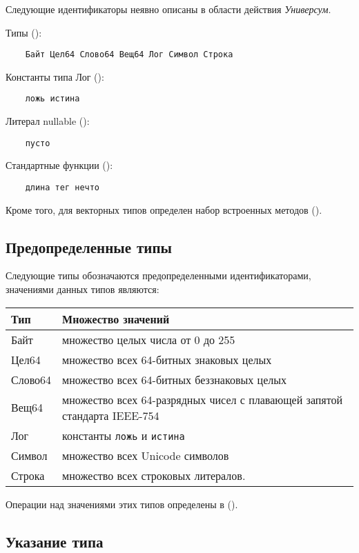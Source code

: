 Следующие идентификаторы неявно описаны в области действия \emph{Универсум}.
\bigskip

Типы ():
\begin{Verbatim}
    Байт Цел64 Слово64 Вещ64 Лог Символ Строка
\end{Verbatim}

Константы типа Лог ():
\begin{Verbatim}
    ложь истина
\end{Verbatim}

Литерал nullable (\See{}):
\begin{Verbatim}
    пусто
\end{Verbatim}

Стандартные функции ():
\begin{Verbatim}
    длина тег нечто
\end{Verbatim}

Кроме того, для векторных типов определен набор встроенных методов ().

\hypertarget{predefined-types}{%
\subsection{Предопределенные типы}\label{decls:predefined-types}}

Следующие типы обозначаются предопределенными идентификаторами, значениями данных типов являются:

\begin{tabular}[c]{l|l}
\textbf{Тип} & \textbf{Множество значений} \\ \hline
Байт &  множество целых числа от 0 до 255   \\
Цел64 & множество всех 64-битных знаковых целых \\
Слово64 & множество всех 64-битных беззнаковых целых \\ 
Вещ64 & множество всех 64-разрядных чисел с плавающей запятой стандарта IEEE-754 \\ 
Лог & константы \verb|ложь| и \verb|истина| \\ 
Символ & множество всех Unicode символов \\ 
Строка & множество всех строковых литералов.
\end{tabular}

\bigskip
Операции над значениями этих типов определены в ().

\hypertarget{type-ref}{%
\subsection{Указание типа}\label{decls:type-ref}}

